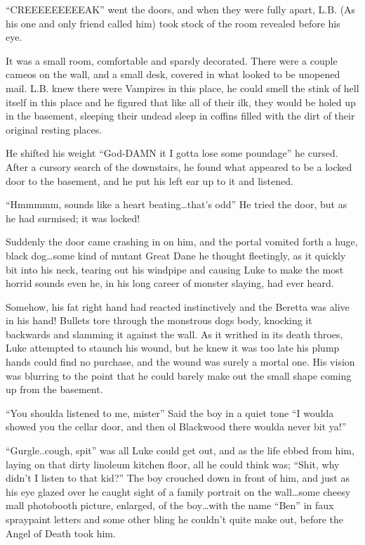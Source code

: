 ``CREEEEEEEEEAK'' went the doors, and when they were fully apart,
L.B. (As his one and only friend called him) took stock of the room
revealed before his eye.

It was a small room, comfortable and sparsly decorated. There were
a couple cameos on the wall, and a small desk, covered in what
looked to be unopened mail. L.B. knew there were Vampires in this
place, he could smell the stink of hell itself in this place and he
figured that like all of their ilk, they would be holed up in the
basement, sleeping their undead sleep in coffins filled with the
dirt of their original resting places.

He shifted his weight ``God-DAMN it I gotta lose some poundage'' he
cursed. After a cursory search of the downstairs, he found what
appeared to be a locked door to the basement, and he put his left
ear up to it and listened.

``Hmmmmm, sounds like a heart beating{\ldots}that's odd'' He tried the
door, but as he had surmised; it was locked!

Suddenly the door came crashing in on him, and the portal vomited
forth a huge, black dog{\ldots}some kind of mutant Great Dane he thought
fleetingly, as it quickly bit into his neck, tearing out his
windpipe and causing Luke to make the most horrid sounds even he,
in his long career of monster slaying, had ever heard.

Somehow, his fat right hand had reacted instinctively and the
Beretta was alive in his hand! Bullets tore through the monstrous
dogs body, knocking it backwards and slamming it against the wall.
As it writhed in its death throes, Luke attempted to staunch his
wound, but he knew it was too late his plump hands could find no
purchase, and the wound was surely a mortal one. His vision was
blurring to the point that he could barely make out the small shape
coming up from the basement.

``You shoulda listened to me, mister'' Said the boy in a quiet tone
``I woulda showed you the cellar door, and then ol Blackwood there
woulda never bit ya!''

``Gurgle..cough, spit'' was all Luke could get out, and as the life
ebbed from him, laying on that dirty linoleum kitchen floor, all he
could think was; ``Shit, why didn't I listen to that kid?'' The boy
crouched down in front of him, and just as his eye glazed over he
caught sight of a family portrait on the wall{\ldots}some cheesy mall
photobooth picture, enlarged, of the boy{\ldots}with the name ``Ben'' in
faux spraypaint letters and some other bling he couldn't quite make
out, before the Angel of Death took him.

